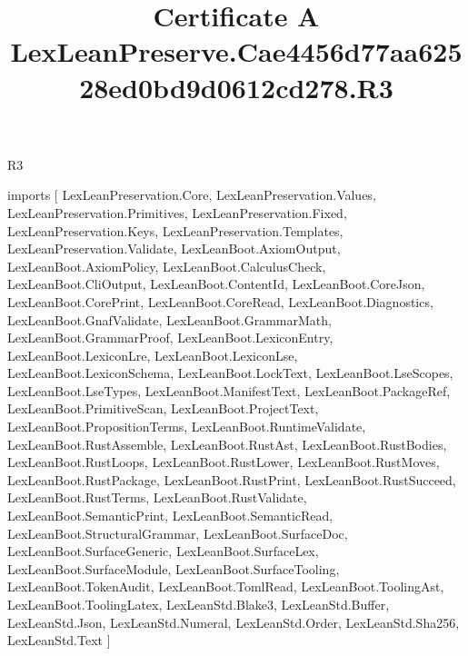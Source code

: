 \begin{lexlean}{R3}
\title{Certificate A LexLeanPreserve.Cae4456d77aa62528ed0bd9d0612cd278.R3}
\begin{coremodule}
imports [
  LexLeanPreservation.Core,
  LexLeanPreservation.Values,
  LexLeanPreservation.Primitives,
  LexLeanPreservation.Fixed,
  LexLeanPreservation.Keys,
  LexLeanPreservation.Templates,
  LexLeanPreservation.Validate,
  LexLeanBoot.AxiomOutput,
  LexLeanBoot.AxiomPolicy,
  LexLeanBoot.CalculusCheck,
  LexLeanBoot.CliOutput,
  LexLeanBoot.ContentId,
  LexLeanBoot.CoreJson,
  LexLeanBoot.CorePrint,
  LexLeanBoot.CoreRead,
  LexLeanBoot.Diagnostics,
  LexLeanBoot.GnafValidate,
  LexLeanBoot.GrammarMath,
  LexLeanBoot.GrammarProof,
  LexLeanBoot.LexiconEntry,
  LexLeanBoot.LexiconLre,
  LexLeanBoot.LexiconLse,
  LexLeanBoot.LexiconSchema,
  LexLeanBoot.LockText,
  LexLeanBoot.LseScopes,
  LexLeanBoot.LseTypes,
  LexLeanBoot.ManifestText,
  LexLeanBoot.PackageRef,
  LexLeanBoot.PrimitiveScan,
  LexLeanBoot.ProjectText,
  LexLeanBoot.PropositionTerms,
  LexLeanBoot.RuntimeValidate,
  LexLeanBoot.RustAssemble,
  LexLeanBoot.RustAst,
  LexLeanBoot.RustBodies,
  LexLeanBoot.RustLoops,
  LexLeanBoot.RustLower,
  LexLeanBoot.RustMoves,
  LexLeanBoot.RustPackage,
  LexLeanBoot.RustPrint,
  LexLeanBoot.RustSucceed,
  LexLeanBoot.RustTerms,
  LexLeanBoot.RustValidate,
  LexLeanBoot.SemanticPrint,
  LexLeanBoot.SemanticRead,
  LexLeanBoot.StructuralGrammar,
  LexLeanBoot.SurfaceDoc,
  LexLeanBoot.SurfaceGeneric,
  LexLeanBoot.SurfaceLex,
  LexLeanBoot.SurfaceModule,
  LexLeanBoot.SurfaceTooling,
  LexLeanBoot.TokenAudit,
  LexLeanBoot.TomlRead,
  LexLeanBoot.ToolingAst,
  LexLeanBoot.ToolingLatex,
  LexLeanStd.Blake3,
  LexLeanStd.Buffer,
  LexLeanStd.Json,
  LexLeanStd.Numeral,
  LexLeanStd.Order,
  LexLeanStd.Sha256,
  LexLeanStd.Text
]


\end{coremodule}
\end{lexlean}
